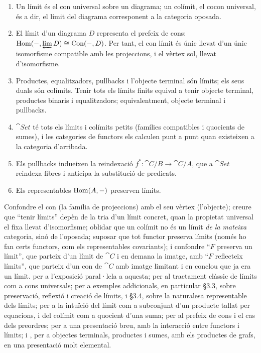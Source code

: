 \begin{resumcap}
\begin{enumerate}
  \item Un límit és el con universal sobre un diagrama; un colímit, el cocon universal, és a dir, el límit del diagrama corresponent a la categoria oposada.
  \item El límit d'un diagrama $D$ representa el prefeix de cons: $\operatorname{Hom}(-,\varprojlim D)\cong\mathrm{Con}(-,D)$. Per tant, el con límit és únic llevat d'un únic isomorfisme compatible amb les projeccions, i el vèrtex sol, llevat d'isomorfisme.
  \item Productes, equalitzadors, pullbacks i l'objecte terminal són límits; els seus duals són colímits. Tenir tots els límits finits equival a tenir objecte terminal, productes binaris i equalitzadors; equivalentment, objecte terminal i pullbacks.
  \item $\cat{Set}$ té tots els límits i colímits petits (famílies compatibles i quocients de sumes), i les categories de functors els calculen punt a punt quan existeixen a la categoria d'arribada.
  \item Els pullbacks indueixen la reindexació $f^{*}\colon\cat{C}/B\to\cat{C}/A$, que a $\cat{Set}$ reindexa fibres i anticipa la substitució de predicats.
  \item Els representables $\operatorname{Hom}(A,-)$ preserven límits.
\end{enumerate}
 Confondre el con (la família de projeccions) amb el seu vèrtex (l'objecte); creure que \enquote{tenir límits} depèn de la tria d'un límit concret, quan la propietat universal el fixa llevat d'isomorfisme; oblidar que un colímit no és un límit \emph{de la mateixa} categoria, sinó de l'oposada; suposar que tot functor preserva límits (només ho fan certs functors, com els representables covariants); i confondre \enquote{$F$ preserva un límit}, que parteix d'un límit de $\cat{C}$ i en demana la imatge, amb \enquote{$F$ reflecteix límits}, que parteix d'un con de $\cat{C}$ amb imatge limitant i en conclou que ja era un límit.
 \cite[cap.~5]{awodey} per a l'exposició paral·lela a aquesta; \cite[III.3--III.4 i cap.~V]{maclane} per al tractament clàssic de límits com a cons universals; \cite[cap.~3]{riehl} per a exemples addicionals, en particular §3.3, sobre preservació, reflexió i creació de límits, i §3.4, sobre la naturalesa representable dels límits; \cite[cap.~9]{barrwells} per a la intuïció del límit com a subconjunt d'un producte tallat per equacions, i del colímit com a quocient d'una suma; \cite[cap.~3]{perrone-notes} per al prefeix de cons i el cas dels preordres; \cite[cap.~5]{leinster} per a una presentació breu, amb la interacció entre functors i límits; i \cite[part~IV, sessions~19--25]{lawvereschanuel}, per a objectes terminals, productes i sumes, amb els productes de grafs, en una presentació molt elemental.
\end{resumcap}
